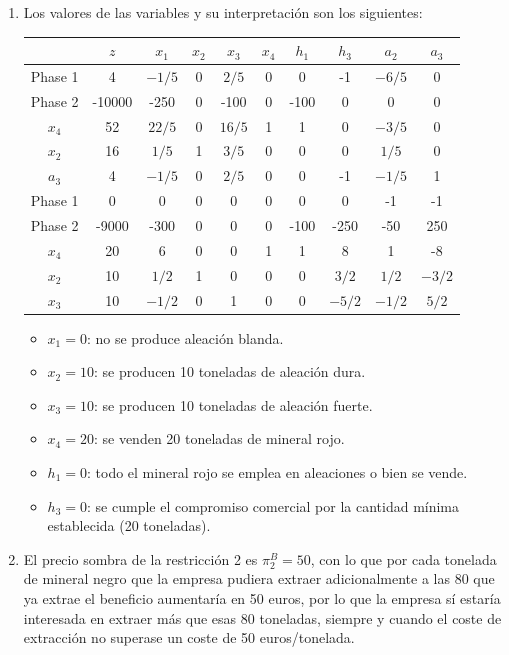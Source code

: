 \begin{enumerate}
\item Los valores de las variables y su interpretación son los siguientes:

\begin{center}
\begin{tabular}{c|c|cccccccc|}
 & $z$ & $x_1$ & $x_2$ & $x_3$ & $x_4$ & $h_1$ & $h_3$ & $a_2$ & $a_3$\\ 
\hline
Phase 1 & 4 & $-1/5$ & 0 & $2/5$ & 0 & 0 & -1 & $-6/5$ & 0 \\ 
Phase 2 & -10000 & -250 & 0 & -100 & 0 & -100 & 0 & 0 & 0 \\ 
\hline
$x_4$ & 52  & $22/5$ & 0 & $16/5$ & 1 & 1 & 0 & $-3/5$ & 0\\ 
$x_2$ & 16  & $1/5$ & 1 & $3/5$ & 0 & 0 & 0 & $1/5$ & 0\\ 
$a_3$ & 4  & $-1/5$ & 0 & $2/5$ & 0 & 0 & -1 & $-1/5$ & 1\\ 
\hline
Phase 1 & 0 & 0 & 0 & 0 & 0 & 0 & 0 & -1 & -1 \\ 
Phase 2 & -9000 & -300 & 0 & 0 & 0 & -100 & -250 & -50 & 250 \\ 
\hline
$x_4$ & 20  & 6 & 0 & 0 & 1 & 1 & 8 & 1 & -8\\ 
$x_2$ & 10  & $1/2$ & 1 & 0 & 0 & 0 & $3/2$ & $1/2$ & $-3/2$\\ 
$x_3$ & 10  & $-1/2$ & 0 & 1 & 0 & 0 & $-5/2$ & $-1/2$ & $5/2$\\ 
\hline
\end{tabular}
\end{center}


\begin{itemize}
    \item $x_1 = 0$: no se produce aleación blanda. 
    \item $x_2 = 10$: se producen 10 toneladas de aleación dura.
    \item $x_3 = 10$: se producen 10 toneladas de aleación fuerte.
    \item $x_4 = 20$: se venden 20 toneladas de mineral rojo.
    \item $h_1 = 0$: todo el mineral rojo se emplea en aleaciones o bien se vende.
    \item $h_3 = 0$: se cumple el compromiso comercial por la cantidad mínima establecida (20 toneladas).
\end{itemize}

\item El precio sombra de la restricción 2 es $\pi^B_2 = 50$, con lo que por cada tonelada de mineral negro que la empresa pudiera extraer adicionalmente a las 80 que ya extrae el beneficio aumentaría en 50 euros, por lo que la empresa sí estaría interesada en extraer más que esas 80 toneladas, siempre y cuando el coste de extracción no superase un coste de 50 euros/tonelada.


\end{enumerate}
